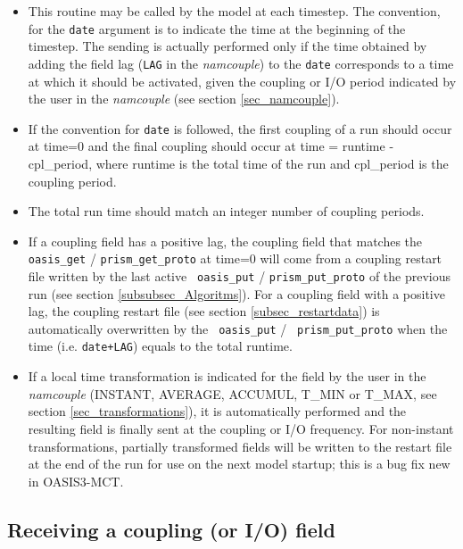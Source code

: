 \begin{itemize}

\item This routine may be called by the model at each timestep. The
  convention, for the {\tt date} argument is to indicate the time at
  the beginning of the timestep. The sending is actually performed
  only if the time obtained by adding the field lag ({\tt LAG} in the
  {\em namcouple}) to the {\tt date} corresponds to a time at which it
  should be activated, given the coupling or I/O period indicated by
  the user in the {\it namcouple} (see section \ref{sec_namcouple}). 
\item If the convention for {\tt date} is followed, the first
  coupling of a run should occur at time=0 and the final coupling
  should occur at time = runtime - cpl\_period, where runtime is the
  total time of the run and cpl\_period is the coupling period. 
\item The total run time should match an integer number of coupling
  periods.
\item If a coupling field has a positive lag, the coupling field that
  matches the {\tt oasis\_get} / {\tt prism\_get\_proto} at time=0
  will come from a coupling restart file written by the last active {\tt
  oasis\_put} / {\tt prism\_put\_proto} of the previous run (see
  section \ref{subsubsec_Algoritms}). For a coupling field with a
  positive lag, the coupling restart file (see section
  \ref{subsec_restartdata}) is automatically overwritten by the {\tt
  oasis\_put} / {\tt
    prism\_put\_proto} when the time (i.e. {\tt date+LAG}) equals
  to the total runtime.
\item If a local time transformation is indicated for the field by the
  user in the {\it namcouple} (INSTANT, AVERAGE, ACCUMUL, T\_MIN or
  T\_MAX, see section \ref{sec_transformations}), it is automatically
  performed and the resulting field is finally sent at the coupling or
  I/O frequency.  For non-instant transformations, partially
  transformed fields will be written to the restart file at the end of
  the run for use on the next model startup; this is a bug fix new in
  OASIS3-MCT.
\end{itemize}

\subsection{Receiving a coupling (or I/O) field}

